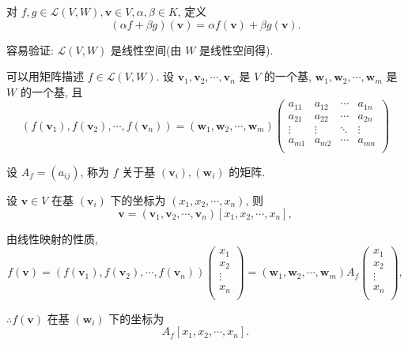 \documentclass[color=black,device=normal,lang=cn,mode=geye]{elegantnote}
\begin{document}
对 $f,g\in\mathcal{L}(V,W),\boldsymbol{v}\in V,\alpha,\beta\in K$, 定义
\[(\alpha f+\beta g)(\boldsymbol{v})=\alpha f(\boldsymbol{v})+\beta g(\boldsymbol{v}).\]

容易验证: $\mathcal{L}(V,W)$ 是线性空间(由 $W$ 是线性空间得).

可以用矩阵描述 $f\in\mathcal{L}(V,W)$. 设 $\boldsymbol{v}_1,\boldsymbol{v}_2,\cdots,\boldsymbol{v}_n$ 是 $V$ 的一个基, $\boldsymbol{w}_1,\boldsymbol{w}_2,\cdots,\boldsymbol{w}_m$ 是 $W$ 的一个基, 且
\[(f(\boldsymbol{v}_1),f(\boldsymbol{v}_2),\cdots,f(\boldsymbol{v}_n))=(\boldsymbol{w}_1,\boldsymbol{w}_2,\cdots,\boldsymbol{w}_m)\begin{pmatrix}
    a_{11} & a_{12} & \cdots & a_{1n} \\
    a_{21} & a_{22} & \cdots & a_{2n} \\
    \vdots & \vdots & \ddots & \vdots \\
    a_{m1} & a_{m2} & \cdots & a_{mn} \\
\end{pmatrix}\]

设 $A_f=(a_{ij})$, 称为 $f$ 关于基 $(\boldsymbol{v}_i),(\boldsymbol{w}_i)$ 的矩阵.

设 $\boldsymbol{v}\in V$ 在基 $(\boldsymbol{v}_i)$ 下的坐标为 $(x_1,x_2,\cdots,x_n)$, 则
\[\boldsymbol{v}=(\boldsymbol{v}_1,\boldsymbol{v}_2,\cdots,\boldsymbol{v}_n)[x_1,x_2,\cdots,x_n],\]

由线性映射的性质,
\begin{equation}\label{eq1.1}
    f(\boldsymbol{v})=(f(\boldsymbol{v}_1),f(\boldsymbol{v}_2),\cdots,f(\boldsymbol{v}_n))\begin{pmatrix}
        x_1 \\
        x_2 \\
        \vdots \\
        x_n \\
    \end{pmatrix}=(\boldsymbol{w}_1,\boldsymbol{w}_2,\cdots,\boldsymbol{w}_m)A_f\begin{pmatrix}
        x_1 \\
        x_2 \\
        \vdots \\
        x_n \\
    \end{pmatrix},
\end{equation}

$\therefore f(\boldsymbol{v})$ 在基 $(\boldsymbol{w}_i)$ 下的坐标为
\[A_f[x_1,x_2,\cdots,x_n].\]
\end{document}
